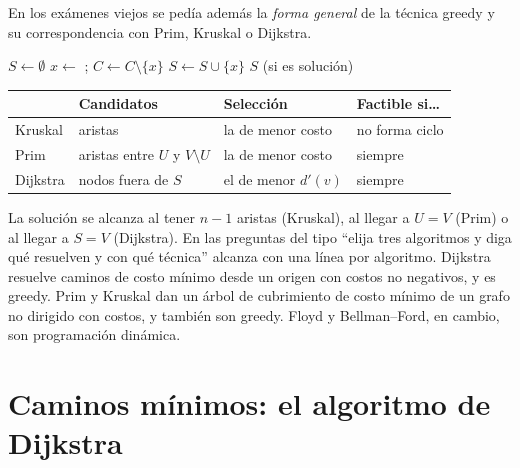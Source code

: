 En los exámenes viejos se pedía además la \emph{forma general} de la técnica greedy y su correspondencia con Prim, Kruskal o Dijkstra.

\begin{algorithmic}[1]
 
  \State $S\gets\emptyset$
    \State $x\gets$ ; $C\gets C\setminus\{x\}$ 
     \State $S\gets S\cup\{x\}$ \EndIf
  \EndWhile
  \State \Return $S$ (si es solución)
\EndFunction
\end{algorithmic}

\begin{center}
\small
\begin{tabularx}{\textwidth}{@{}>{\raggedright\arraybackslash}p{1.7cm}>{\raggedright\arraybackslash}X>{\raggedright\arraybackslash}X>{\raggedright\arraybackslash}p{2.6cm}@{}}
\toprule
 & Candidatos & Selección & Factible si\dots \\
\midrule
Kruskal & aristas & la de menor costo & no forma ciclo \\
Prim & aristas entre $U$ y $V\setminus U$ & la de menor costo & siempre \\
Dijkstra & nodos fuera de $S$ & el de menor $d'(v)$ & siempre \\
\bottomrule
\end{tabularx}
\end{center}

La solución se alcanza al tener $n-1$ aristas (Kruskal), al llegar a $U=V$ (Prim) o al llegar a $S=V$ (Dijkstra). En las preguntas del tipo ``elija tres algoritmos y diga qué resuelven y con qué técnica'' alcanza con una línea por algoritmo. Dijkstra resuelve caminos de costo mínimo desde un origen con costos no negativos, y es greedy. Prim y Kruskal dan un árbol de cubrimiento de costo mínimo de un grafo no dirigido con costos, y también son greedy. Floyd y Bellman–Ford, en cambio, son programación dinámica.

\section{Caminos mínimos: el algoritmo de Dijkstra}

